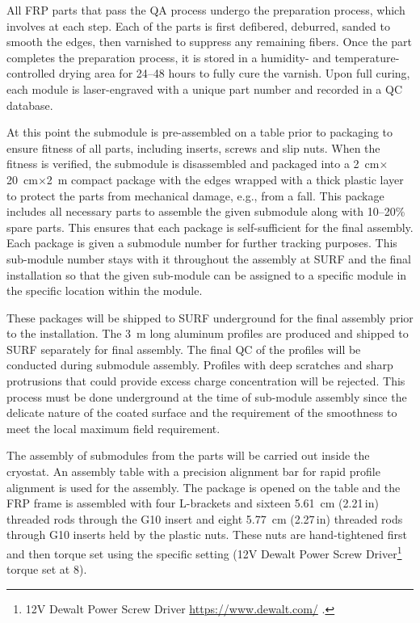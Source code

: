 All FRP parts that pass the QA process undergo the preparation process, which involves  at each step.  Each of the parts is first defibered, deburred, sanded to smooth the edges, then varnished to
suppress any remaining fibers.  Once the part completes the preparation process, it is stored in a humidity- and temperature-controlled drying area for \numrange{24}{48} hours to fully cure the varnish.  Upon full curing, each module is laser-engraved with a unique part number and recorded in a QC database. 

At this point the submodule is pre-assembled on a table prior to packaging to ensure fitness of all parts, including inserts, screws and slip nuts.   When the fitness is verified, the submodule is disassembled and packaged into a \SI{2}{\cm}$\times$\SI{20}{\cm}$\times$\SI{2}{\m} compact package with the edges wrapped with a thick plastic layer to protect the parts from mechanical damage, e.g., from a fall.  This package includes all necessary parts to assemble the given submodule 
along with \numrange{10}{20}\% spare parts.  This ensures that each package is self-sufficient for the final assembly.  Each package is given a submodule number for further tracking purposes.  This sub-module number stays with it throughout the assembly at SURF and the final installation so that the given sub-module can be assigned to a specific module in the specific location within the module. 

These packages will be shipped to SURF underground 
for the final assembly prior to the installation.   
The \SI{3}{\m} long aluminum profiles are produced and shipped to SURF separately for final assembly.  The final QC of the profiles will be conducted during submodule assembly.   Profiles with deep scratches and sharp protrusions that could provide excess charge concentration will be rejected. This process must be done underground at the time of sub-module assembly since the delicate nature of the coated surface and the requirement of the smoothness to meet the local maximum field requirement.

The assembly of submodules from the parts will be carried out inside the cryostat.   An assembly table with a precision alignment bar for rapid profile alignment is used for the assembly.   The package is opened on the table and the FRP frame is assembled with four L-brackets and sixteen \SI{5.61}{\cm} (\num{2.21}\,in) threaded rods through the G10 insert and eight \SI{5.77}{\cm} (\num{2.27}\,in) threaded rods through G10 inserts held by the plastic nuts.  These nuts are hand-tightened first and then torque set using the specific setting (12V Dewalt Power Screw Driver\footnote{12V Dewalt\texttrademark{} Power Screw Driver \url{https://www.dewalt.com/} .} torque set at 8).

